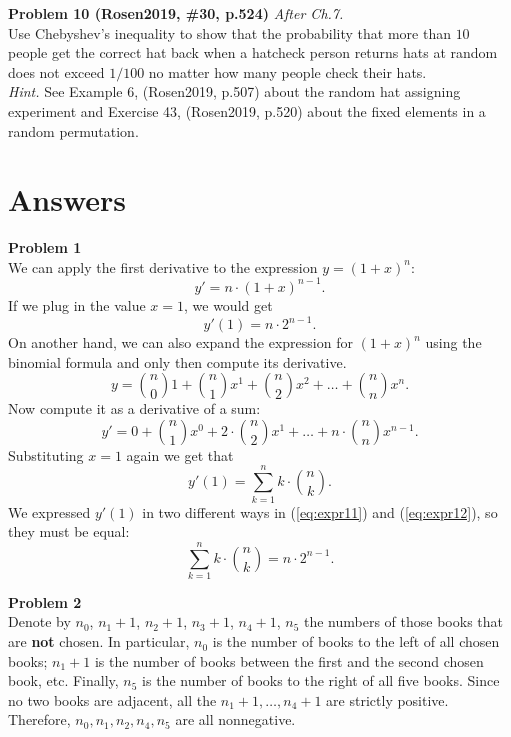 \documentclass[jou]{apa6}
\begin{document}
\vspace{8pt}
{\bf Problem 10 (Rosen2019, \#30, p.524)} \textendash{} {\em After Ch.7.}\\
Use Chebyshev's inequality to show that the probability that more than $10$ people get the 
correct hat back when a hatcheck person returns hats at random does not exceed $1/100$
no matter how many people check their hats.\\
{\em Hint.} See Example 6, (Rosen2019, p.507) about the random hat assigning experiment 
and Exercise 43, (Rosen2019, p.520) about the fixed elements in a random permutation.







\newpage

\section{Answers}

\vspace{4pt}
{\bf Problem 1}\\
We can apply the first derivative to the expression $y = (1+x)^n$: 
$$y' = n \cdot (1 + x)^{n-1}.$$
If we plug in the value $x = 1$, we would get 
\begin{equation}
\label{eq:expr11}
y'(1) = n \cdot 2^{n-1}.
\end{equation}
On another hand, we can also expand the expression for $(1+x)^n$ using
the binomial formula and only then compute its derivative. 
$$y = {n \choose 0} 1 + {n \choose 1} x^1 + {n \choose 2} x^2 + \ldots + {n \choose n} x^n.$$
Now compute it as a derivative of a sum: 
$$y' = 0 + {n \choose 1} x^0 + 2 \cdot {n \choose 2} x^1 + \ldots + n \cdot {n \choose n} x^{n-1}.$$
Substituting $x=1$ again we get that 
\begin{equation}
\label{eq:expr12}
y'(1) = \sum\limits_{k=1}^n k \cdot {n \choose k}.
\end{equation}
We expressed $y'(1)$ in two different ways in (\ref{eq:expr11}) and (\ref{eq:expr12}), so they must be equal:
$$\sum\limits_{k=1}^n k \cdot{} {n \choose k} = n \cdot{} 2^{n-1}.$$

\vspace{10pt}
{\bf Problem 2}\\
Denote by $n_0$, $n_1+1$, $n_2+1$, $n_3+1$, $n_4+1$, $n_5$ the numbers of those books that are {\bf not}
chosen. In particular, $n_0$ is the number of books to the left of all chosen books; 
$n_1+1$ is the number of books between the first and the second chosen book, etc. 
Finally, $n_5$ is the number of books to the right of all five books. 
Since no two books are adjacent, all the $n_1+1,\ldots,n_4+1$ are strictly positive. 
Therefore, $n_0,n_1,n_2,n_4,n_5$ are all nonnegative. 
\end{document}
